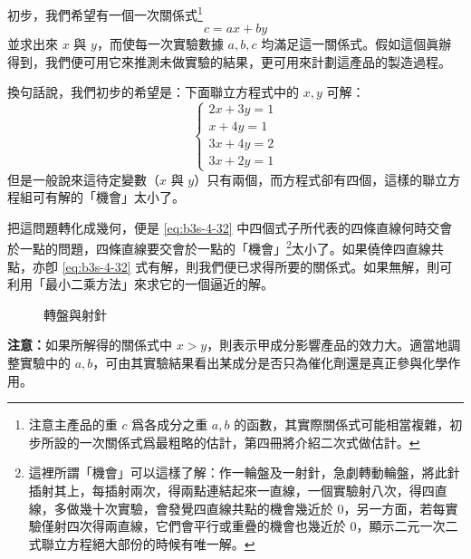 初步，我們希望有一個一次關係式\footnote{注意主產品的重 $c$ 爲各成分之重 $a, b$ 的函數，其實際關係式可能相當複雜，初步所設的一次關係式爲最粗略的估計，第四冊將介紹二次式做估計。}
\[
c = ax + by
\]
並求出來 $x$ 與 $y$，而使每一次實驗數據 $a, b, c$ 均滿足這一關係式。假如這個眞辦得到，我們便可用它來推測未做實驗的結果，更可用來計劃這產品的製造過程。

換句話說，我們初步的希望是：下面聯立方程式中的 $x, y$ 可解：
\begin{equation}
\begin{cases}
2x + 3y = 1 \\
x + 4y = 1 \\
3x + 4y = 2 \\
3x + 2y = 1
\end{cases}
\label{eq:b3s-4-32}
\end{equation}
但是一般說來這待定變數（$x$ 與 $y$）只有兩個，而方程式卻有四個，這樣的聯立方程組可有解的「機會」太小了。

把這問題轉化成幾何，便是 \eqref{eq:b3s-4-32} 中四個式子所代表的四條直線何時交會於一點的問題，四條直線要交會於一點的「機會」\footnote{這裡所謂「機會」可以這樣了解：作一輪盤及一射針，急劇轉動輪盤，將此針插射其上，每插射兩次，得兩點連結起來一直線，一個實驗射八次，得四直線，多做幾十次實驗，會發覺四直線共點的機會幾近於 0，另一方面，若每實驗僅射四次得兩直線，它們會平行或重疊的機會也幾近於 0，顯示二元一次二式聯立方程絕大部份的時候有唯一解。}太小了。如果僥倖四直線共點，亦卽 \eqref{eq:b3s-4-32} 式有解，則我們便已求得所要的關係式。如果無解，則可利用「最小二乘方法」來求它的一個逼近的解。

\begin{figure}[H]
\centering
{}
\caption{轉盤與射針}
\label{fig:4-41}
\end{figure}

\noindent\textbf{注意：}如果所解得的關係式中 $x > y$，則表示甲成分影響產品的效力大。適當地調整實驗中的 $a, b$，可由其實驗結果看出某成分是否只為催化劑還是真正參與化學作用。

